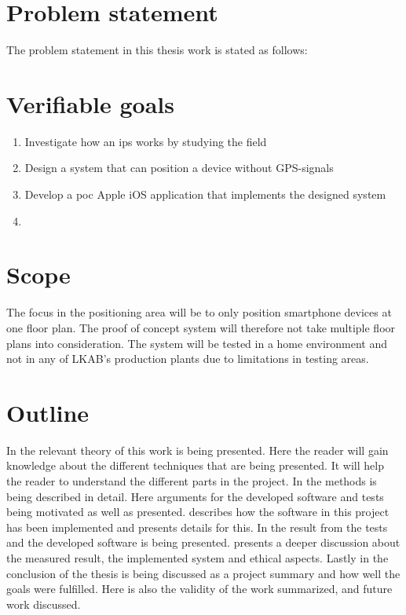 \section{Problem statement}\label{sec:introProblemStatement}
The problem statement in this thesis work is stated as follows:

\section{Verifiable goals}\label{sec:introGoals}
\begin{enumerate}
	\item \label{goal:fieldInvestigation}
	Investigate how an \acrfull{ips} works by studying the field

	\item \label{goal:systemDesign}
	Design a system that can position a device without GPS-signals

	\item \label{goal:poc}
	Develop a \acrfull{poc} Apple iOS application that implements the designed system

	\item \label{goal:systemEvaluation}
\end{enumerate}


\section{Scope}
The focus in the positioning area will be to only position smartphone devices at one floor plan.
The proof of concept system will therefore not take multiple floor plans into consideration.
The system will be tested in a home environment and not in any of LKAB's production plants due to
limitations in testing areas.


\section{Outline}
In  the relevant theory of this work is being presented.
Here the reader will gain knowledge about the different techniques that are being presented.
It will help the reader to understand the  different parts in the project.
In  the methods is being described in detail.
Here arguments for the developed software and tests being motivated as well as presented.
 describes how the software in this project has been implemented and presents details for this.
In  the result from the tests and the developed software is being presented.
 presents a deeper discussion about the measured result, the implemented system and ethical aspects.
Lastly in  the conclusion of the thesis is being discussed as a project summary and how well the goals were fulfilled.
Here is also the validity of the work summarized, and future work discussed.


